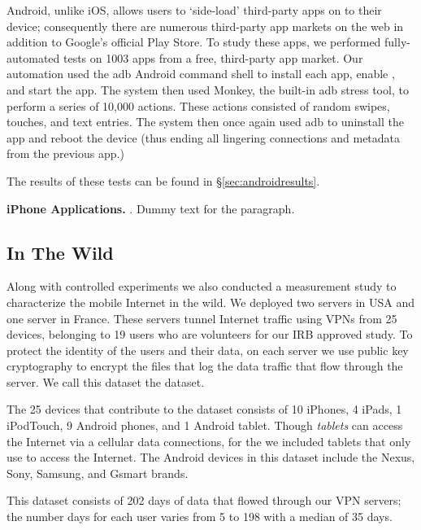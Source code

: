   Android, unlike iOS, allows users to `side-load' third-party apps on to their device; consequently there are numerous third-party app markets on the web in addition to Google's official Play Store.
  To study these apps, we performed fully-automated tests on 1003 apps from a free, third-party app market.
  Our automation used the adb Android command shell to install each app, enable \platname, and start the app.
  The system then used Monkey, the built-in adb stress tool, to perform a series of 10,000 actions. These actions consisted of random swipes, touches, and text entries.
  The system then once again used adb to uninstall the app and reboot the device (thus ending all lingering connections and metadata from the previous app.)

  The results of these tests can be found in \S\ref{sec:androidresults}.

  {\bf iPhone Applications.}
. 
Dummy text for the paragraph.

\subsection{In The Wild}

Along with controlled experiments we also conducted a measurement study to characterize the mobile Internet in the wild.
We deployed two \platname servers in USA and one server in France. 
These servers tunnel Internet traffic using VPNs from 25 devices, belonging to 19 users who are volunteers for our IRB approved study.
To protect the identity of the users and their data, on each server we use public key cryptography to encrypt the files that log the data traffic that flow through the server. 
We call this dataset the \moball dataset. 

The 25 devices that contribute to the \moball dataset consists of 10 iPhones, 4 iPads, 1 iPodTouch, 9 Android phones, and 1 Android tablet.
Though \emph{tablets} can access the Internet via a cellular data connections, for the \moball we included tablets that only use \wifi to access the Internet.
The Android devices in this dataset include the Nexus, Sony, Samsung, and Gsmart brands.

This dataset consists of 202 days of data that flowed through our VPN servers; the number days for each user varies from 5 to 198 with a median of 35 days.

